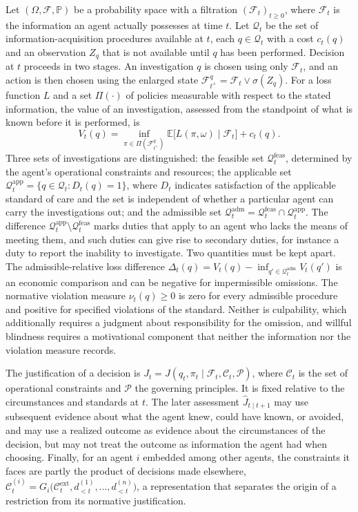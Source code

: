 \documentclass[11pt]{article}
\newcommand{\F}{\mathcal F}
\newcommand{\Q}{\mathcal Q}
\newcommand{\C}{\mathcal C}
\newcommand{\PP}{\mathbb P}
\newcommand{\E}{\mathbb E}
\newcommand{\feas}{\mathrm{feas}}
\newcommand{\adm}{\mathrm{adm}}
\newcommand{\app}{\mathrm{app}}
\theoremstyle{plain}
\theoremstyle{definition}
\begin{document}
Let $(\Omega,\F,\PP)$ be a probability space with a filtration $(\F_t)_{t\ge 0}$, where $\F_t$ is the information an agent actually possesses at time $t$. Let $\Q_t$ be the set of information-acquisition procedures available at $t$, each $q\in\Q_t$ with a cost $c_t(q)$ and an observation $Z_q$ that is not available until $q$ has been performed. Decision at $t$ proceeds in two stages. An investigation $q$ is chosen using only $\F_t$, and an action is then chosen using the enlarged state $\F_{t^{+}}^{q}=\F_t\vee\sigma(Z_q)$. For a loss function $L$ and a set $\Pi(\cdot)$ of policies measurable with respect to the stated information, the value of an investigation, assessed from the standpoint of what is known before it is performed, is
\[
V_t(q)=\inf_{\pi\in\Pi(\F_{t^{+}}^{q})}\E\bigl[L(\pi,\omega)\mid\F_t\bigr]+c_t(q).
\]
Three sets of investigations are distinguished: the feasible set $\Q_t^{\feas}$, determined by the agent's operational constraints and resources; the applicable set $\Q_t^{\app}=\{q\in\Q_t:D_t(q)=1\}$, where $D_t$ indicates satisfaction of the applicable standard of care and the set is independent of whether a particular agent can carry the investigations out; and the admissible set $\Q_t^{\adm}=\Q_t^{\feas}\cap\Q_t^{\app}$. The difference $\Q_t^{\app}\setminus\Q_t^{\feas}$ marks duties that apply to an agent who lacks the means of meeting them, and such duties can give rise to secondary duties, for instance a duty to report the inability to investigate. Two quantities must be kept apart. The admissible-relative loss difference $\Delta_t(q)=V_t(q)-\inf_{q'\in\Q_t^{\adm}}V_t(q')$ is an economic comparison and can be negative for impermissible omissions. The normative violation measure $\nu_t(q)\ge 0$ is zero for every admissible procedure and positive for specified violations of the standard. Neither is culpability, which additionally requires a judgment about responsibility for the omission, and willful blindness requires a motivational component that neither the information nor the violation measure records.

The justification of a decision is $J_t=J(q_t,\pi_t\mid\F_t,\C_t,\mathcal P)$, where $\C_t$ is the set of operational constraints and $\mathcal P$ the governing principles. It is fixed relative to the circumstances and standards at $t$. The later assessment $\widehat J_{t\mid t+1}$ may use subsequent evidence about what the agent knew, could have known, or avoided, and may use a realized outcome as evidence about the circumstances of the decision, but may not treat the outcome as information the agent had when choosing. Finally, for an agent $i$ embedded among other agents, the constraints it faces are partly the product of decisions made elsewhere, $\C_t^{(i)}=G_i\bigl(\C_t^{\mathrm{ext}},d_{<t}^{(1)},\ldots,d_{<t}^{(n)}\bigr)$, a representation that separates the origin of a restriction from its normative justification.
\end{document}
